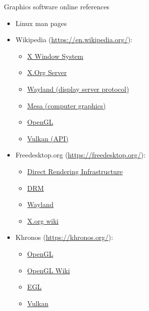 \begin{frame}{Graphics software online references}
  \small
  \begin{minipage}[t]{0.45\textwidth}
  \begin{itemize}
  \item Linux man pages
  \item Wikipedia (\url{https://en.wikipedia.org/}):
    \begin{itemize}
    \item \href{https://en.wikipedia.org/wiki/X_Window_System}{X Window System}
    \item \href{https://en.wikipedia.org/wiki/X.Org_Server}{X.Org Server}
    \item \href{https://en.wikipedia.org/wiki/Wayland_(display_server_protocol)}{Wayland (display server protocol)}
    \item \href{https://en.wikipedia.org/wiki/Mesa_(computer_graphics)}{Mesa (computer graphics)}
    \item \href{https://en.wikipedia.org/wiki/OpenGL}{OpenGL}
    \item \href{https://en.wikipedia.org/wiki/Vulkan_(API)}{Vulkan (API)}
    \end{itemize}
  \end{itemize}
  \end{minipage}
  \hfill
  \begin{minipage}[t]{0.5\textwidth}
  \begin{itemize}
  \item Freedesktop.org (\url{https://freedesktop.org/}):
    \begin{itemize}
    \item \href{https://dri.freedesktop.org/wiki/}{Direct Rendering Infrastructure}
    \item \href{https://dri.freedesktop.org/wiki/DRM/}{DRM}
    \item \href{https://wayland.freedesktop.org/}{Wayland}
    \item \href{https://www.x.org/wiki/}{X.org wiki}
    \end{itemize}
  \item Khronos (\url{https://khronos.org/}):
    \begin{itemize}
    \item \href{https://www.khronos.org/opengl/}{OpenGL}
    \item \href{https://www.khronos.org/opengl/wiki/}{OpenGL Wiki}
    \item \href{https://www.khronos.org/egl/}{EGL}
    \item \href{https://www.khronos.org/vulkan/}{Vulkan}
    \end{itemize}
  \end{itemize}
  \end{minipage}
\end{frame}
